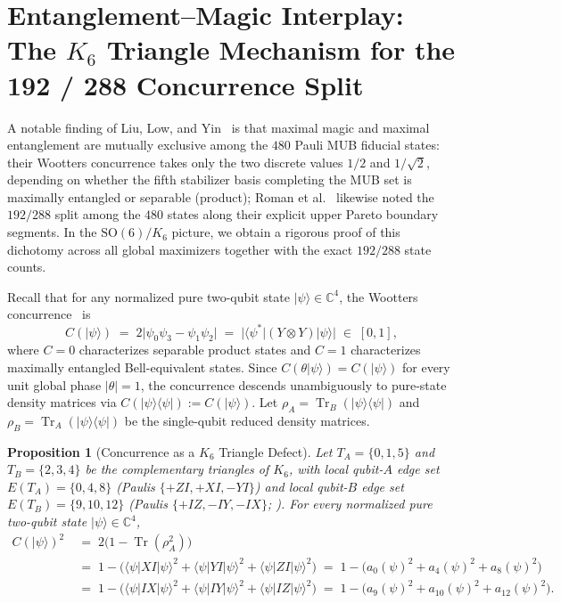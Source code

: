 \documentclass[11pt,a4paper]{article}
\theoremstyle{plain}
\newtheorem{proposition}[theorem]{Proposition}
\theoremstyle{definition}
\theoremstyle{remark}
\newcommand{\C}{\mathbb{C}}
\newcommand{\ket}[1]{\lvert #1 \rangle}
\newcommand{\bra}[1]{\langle #1 \rvert}
\newcommand{\ketbra}[2]{\lvert #1 \rangle\langle #2 \rvert}
\newcommand{\expval}[2]{\langle #1 \vert #2 \vert #1 \rangle}
\newcommand{\Tr}{\operatorname{Tr}}
\newcommand{\SO}{\mathrm{SO}}
\begin{document}
\section{Entanglement--Magic Interplay: The \texorpdfstring{$K_6$}{K6} Triangle Mechanism for the 192 / 288 Concurrence Split}
\label{sec:entanglement}

A notable finding of Liu, Low, and Yin~\cite{LiuLowYin2026} is that maximal magic and maximal entanglement are mutually exclusive among the $480$ Pauli MUB fiducial states: their Wootters concurrence takes only the two discrete values $1/2$ and $1/\sqrt{2}$, depending on whether the fifth stabilizer basis completing the MUB set is maximally entangled or separable (product); Roman et al.~\cite{Roman2026} likewise noted the $192/288$ split among the $480$ states along their explicit upper Pareto boundary segments. In the $\SO(6)/K_6$ picture, we obtain a rigorous proof of this dichotomy across all global maximizers together with the exact $192/288$ state counts.

Recall that for any normalized pure two-qubit state $\ket{\psi} \in \C^4$, the Wootters concurrence~\cite{Wootters1998} is
\begin{equation}
  \label{eq:conc-def}
  C(\ket{\psi}) \;=\; 2\lvert \psi_0 \psi_3 - \psi_1 \psi_2 \rvert \;=\; \lvert \bra{\psi^*} (Y \otimes Y) \ket{\psi} \rvert \;\in\; [0, 1],
\end{equation}
where $C = 0$ characterizes separable product states and $C = 1$ characterizes maximally entangled Bell-equivalent states. Since $C(\theta\ket{\psi}) = C(\ket{\psi})$ for every unit global phase $\lvert\theta\rvert = 1$, the concurrence descends unambiguously to pure-state density matrices via $C(\ketbra{\psi}{\psi}) := C(\ket{\psi})$. Let $\rho_A = \Tr_B(\ketbra{\psi}{\psi})$ and $\rho_B = \Tr_A(\ketbra{\psi}{\psi})$ be the single-qubit reduced density matrices.

\begin{proposition}[Concurrence as a $K_6$ Triangle Defect]
\label{prop:conc-triangle}
Let $T_A = \{0, 1, 5\}$ and $T_B = \{2, 3, 4\}$ be the complementary triangles of $K_6$, with local qubit-$A$ edge set $E(T_A) = \{0, 4, 8\}$ (Paulis $\{+ZI, +XI, -YI\}$) and local qubit-$B$ edge set $E(T_B) = \{9, 10, 12\}$ (Paulis $\{+IZ, -IY, -IX\}$; ). For every normalized pure two-qubit state $\ket{\psi} \in \C^4$,
\begin{align}
  C(\ket{\psi})^2
  &\;=\; 2\bigl(1 - \Tr(\rho_A^2)\bigr) \nonumber\\
  &\;=\; 1 - \bigl(\expval{\psi}{XI}^2 + \expval{\psi}{YI}^2 + \expval{\psi}{ZI}^2\bigr)
  \;=\; 1 - \bigl(a_0(\psi)^2 + a_4(\psi)^2 + a_8(\psi)^2\bigr) \label{eq:conc-TA} \\
  &\;=\; 1 - \bigl(\expval{\psi}{IX}^2 + \expval{\psi}{IY}^2 + \expval{\psi}{IZ}^2\bigr)
  \;=\; 1 - \bigl(a_9(\psi)^2 + a_{10}(\psi)^2 + a_{12}(\psi)^2\bigr). \label{eq:conc-TB}
\end{align}
\end{proposition}
\end{document}
